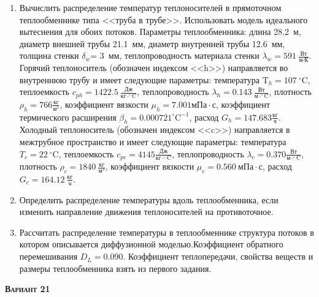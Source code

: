 \begin{enumerate} 
\item Вычислить распределение температур теплоносителей в прямоточном теплообменнике типа <<труба в трубе>>. Использовать модель идеального вытеснения для обоих потоков. Параметры теплообменника: длина  28.2~м, диаметр внешней трубы 21.1~мм,  диаметр внутренней трубы 12.6~мм, толщина стенки $\delta_{w}$=     3~мм,  теплопроводность материала стенки $\lambda_{w}=  591~\frac{\text{Вт}}{\text{м} \cdot \text{К}}$.  Горячий теплоноситель (обозначен индексом <<h>>) направляется во внутреннюю трубу и	 имеет следующие параметры: температура $\text{T}_{h}= 107~^\circ\mathrm{C}$, теплоемкость	  $c_{p{h}}= 1422.5~\frac{\text{Дж}}{\text{кг} \cdot ^\circ\mathrm{C}}$, теплопроводность 		$\lambda_{h}= 0.143~\frac{\text{Вт}}{\text{м} \cdot ^\circ\mathrm{C}}$, плотность 		$\rho_{h}=  766 \frac{\text{кг}}{\text{м}^3}$, коэффициент вязкости $\mu_{h}=7.001 \text{мПа} 		\cdot \text{с} $, коэффициент термического расширения $\beta_{h}=0.000721 ^\circ\mathrm{C}^{-1}$,		 расход $G_{h}= 147.683 \frac{\text{кг}}{\text{ч}}$. Холодный теплоноситель (обозначен индексом <<c>>) 		 направляется в межтрубное пространство и имеет следующие параметры: температура $T_{c}=   22		 ~^\circ\mathrm{C}$, теплоемкость $c_{p{c}}= 4145 \frac{\text{Дж}}{\text{кг} \cdot ^\circ\mathrm{C}}$,			 теплопроводность $\lambda_{c}=0.370 \frac{\text{Вт}}{\text{м} \cdot ^\circ\mathrm{C}}$, плотность 			 $\rho_{c}=  1840~\frac{\text{кг}}{\text{м}^3}$, коэффициент вязкости $\mu_{c}=0.560~\text{мПа} \cdot \text{с} $, 			 расход $G_{c}=164.12~\frac{\text{кг}}{\text{ч}}$. 

\item Определить распределение температуры вдоль теплообменника, если 	изменить направление движения теплоносителей на противоточное.

\item Рассчитать распределение температуры в теплообменнике структура потоков в котором описывается диффузионной моделью.Коэффициент обратного перемешивания $D_L = $0.090. Коэффициент теплопередачи, свойства веществ и размеры теплообменника взять из первого задания. 

\end{enumerate}

\textsc{\textbf{Вариант 21}}


